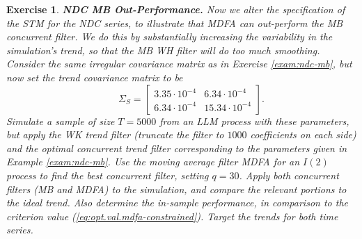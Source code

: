 \documentclass[a4paper]{book}
\newtheorem{Exercise}{Exercise}
\begin{document}
\begin{Exercise} {\bf NDC MB Out-Performance.}  \rm
\label{exer:ndc-mb2}
 Now we alter the specification of the STM for the NDC series,
  to illustrate that MDFA can out-perform the MB concurrent filter.  
  We do this by substantially increasing the
 variability in the simulation's trend, so that the MB WH filter
 will do too much smoothing.  Consider the same irregular covariance
  matrix as in Exercise \ref{exam:ndc-mb}, but now set the trend
 covariance matrix to be
\[
   \qquad  \Sigma_{S} = \left[ \begin{array}{ll}
       3.35 \cdot 10^{-4}  &  6.34 \cdot 10^{-4}   \\
       6.34 \cdot 10^{-4}  &  15.34 \cdot 10^{-4}  \end{array} \right].
\]
 Simulate a sample of size $T=5000$ from an LLM process with these parameters,
 but apply  the WK trend filter
(truncate the filter to $1000$ coefficients on each side) and the 
 optimal concurrent trend filter  corresponding to the parameters
  given in Example \ref{exam:ndc-mb}.  
 Use the moving average filter  MDFA  for an $I(2)$ process  to find the best
 concurrent filter, setting $q= 30$.
    Apply both concurrent filters (MB and MDFA)
 to the simulation, and compare the relevant portions to the ideal trend.
 Also determine the in-sample performance, in comparison to the criterion value
 (\ref{eq:opt.val.mdfa-constrained}).   Target the trends for both time series.
\end{Exercise}
\end{document}
